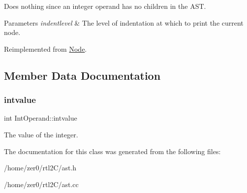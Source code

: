 Does nothing since an integer operand has no children in the A\+ST. 
\begin{DoxyParams}{Parameters}
{\em indentlevel} & The level of indentation at which to print the current node. \\
\hline
\end{DoxyParams}


Reimplemented from \hyperlink{class_node_a3e67ec8d22182b721717af14fe0c3000}{Node}.



\subsection{Member Data Documentation}
\mbox{\label{class_int_operand_ac63d408480b2e50d99d1b239a8466d1a}} 
\subsubsection{\texorpdfstring{intvalue}{intvalue}}
{\footnotesize\ttfamily int Int\+Operand\+::intvalue\hspace{0.3cm}{\ttfamily [protected]}}

The value of the integer. 

The documentation for this class was generated from the following files\+:\begin{DoxyCompactItemize}
\item 
/home/zer0/rtl2\+C/ast.\+h\item 
/home/zer0/rtl2\+C/ast.\+cc\end{DoxyCompactItemize}
